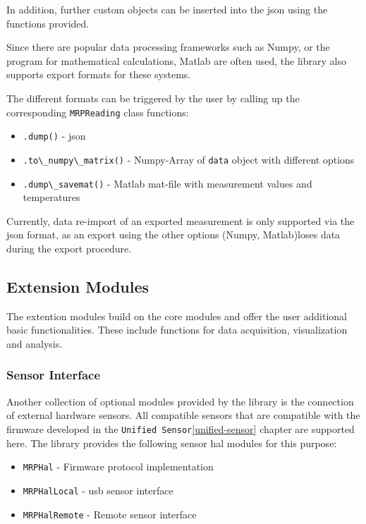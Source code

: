 In addition, further custom objects can be inserted into the \gls{json}
using the functions provided.

Since there are popular data processing frameworks such as
Numpy\cite{harris2020array}, or the program for mathematical
calculations, Matlab are often used, the library also supports export
formats for these systems.

The different formats can be triggered by the user by calling up the
corresponding \passthrough{\lstinline!MRPReading!} class functions:

\begin{itemize}
\tightlist
\item
  \passthrough{\lstinline!.dump()!} - \gls{json}
\item
  \passthrough{\lstinline!.to\_numpy\_matrix()!} - Numpy-Array of
  \passthrough{\lstinline!data!} object with different options
\item
  \passthrough{\lstinline!.dump\_savemat()!} - Matlab mat-file with
  measurement values and temperatures
\end{itemize}

Currently, data re-import of an exported measurement is only supported
via the \gls{json} format, as an export using the other options (Numpy,
Matlab)loses data during the export procedure.

\hypertarget{extension-modules}{%
\subsection{Extension Modules}\label{extension-modules}}

The extention modules build on the core modules and offer the user
additional basic functionalities. These include functions for data
acquisition, visualization and analysis.

\hypertarget{sensor-interface}{%
\subsubsection{Sensor Interface}\label{sensor-interface}}

Another collection of optional modules provided by the library is the
connection of external hardware sensors. All compatible sensors that are
compatible with the firmware developed in the
\passthrough{\lstinline!Unified Sensor!}\ref{unified-sensor} chapter are
supported here. The library provides the following sensor \gls{hal}
modules for this purpose:

\begin{itemize}
\tightlist
\item
  \passthrough{\lstinline!MRPHal!} - Firmware protocol implementation
\item
  \passthrough{\lstinline!MRPHalLocal!} - \gls{usb} sensor interface
\item
  \passthrough{\lstinline!MRPHalRemote!} - Remote sensor interface
\end{itemize}

